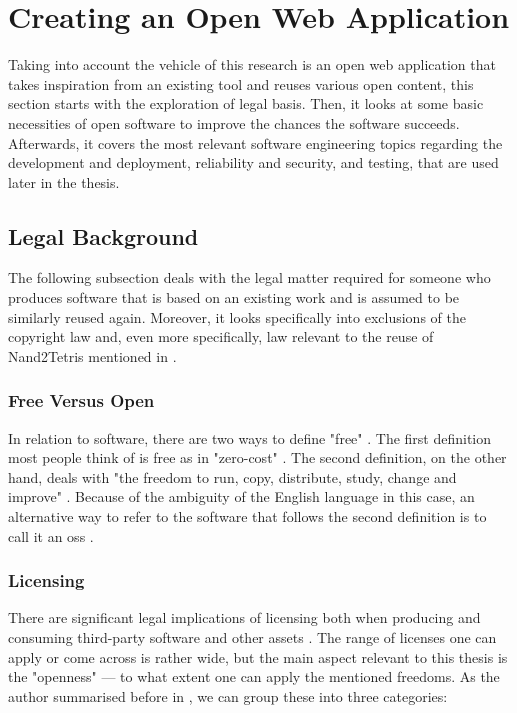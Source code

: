 \section{Creating an Open Web Application}
\label{sec:creating-application}

Taking into account the vehicle of this research is an open web application that takes inspiration from an existing tool and reuses various open content, this section starts with the exploration of legal basis.
Then, it looks at some basic necessities of open software to improve the chances the software succeeds.
Afterwards, it covers the most relevant software engineering topics regarding the development and deployment, reliability and security, and testing, that are used later in the thesis.

\subsection{Legal Background}

The following subsection deals with the legal matter required for someone who produces software that is based on an existing work and is assumed to be similarly reused again.
Moreover, it looks specifically into exclusions of the copyright law and, even more specifically, law relevant to the reuse of Nand2Tetris mentioned in .

\subsubsection{Free Versus Open}

In relation to software, there are two ways to define "free" \parencite[Chapter~1]{Fogel_2022}.
The first definition most people think of is free as in "zero-cost" \parencite[Chapter~1]{Fogel_2022}.
The second definition, on the other hand, deals with "the freedom to run, copy, distribute, study, change and improve" \parencite{FFS_2023}.
Because of the ambiguity of the English language in this case, an alternative way to refer to the software that follows the second definition is to call it an \gls{oss} \parencite{Fogel_2022}.

\subsubsection{Licensing}

There are significant legal implications of licensing both when producing and consuming third-party software and other assets \parencites[Chapter~9]{Fogel_2022}[pp. 11-12]{Duras_2020}.
The range of licenses one can apply or come across is rather wide, but the main aspect relevant to this thesis is the "openness" --- to what extent one can apply the mentioned freedoms.
As the author summarised before in \textcite{Duras_2020}, we can group these into three categories:

